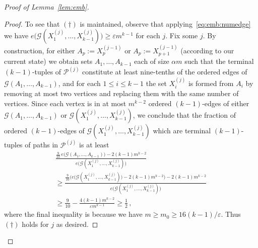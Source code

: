 \documentclass[12pt,a4paper]{amsart}
\let\eps\varepsilon
\newcommand{\oldqed}{}
\def\endofClaim{\hfill\scalebox{.6}{$\Box$}}
\newenvironment{claimproof}[1][Proof]{
  \renewcommand{\oldqed}{\qedsymbol}
  \renewcommand{\qedsymbol}{\endofClaim}
  \begin{proof}[#1]
}{
  \end{proof}
  \renewcommand{\qedsymbol}{\oldqed}
}
\newcommand{\cG}{\mathcal{G}}
\newcommand{\paths}{\mathscr{P}}
\begin{document}
\begin{proof}[Proof of Lemma~\ref{lem:emb}]
\begin{claimproof}
 To see that $(\dagger)$ is maintained, observe that applying~\eqref{eq:emb:numedge} we have $e\big(\cG(X_1^{(j)},\ldots,X_{k-1}^{(j)})\big)\ge\eps m^{k-1}$ for each $j$. Fix some $j$. By construction, for either $A_p := X^{(j-1)}_p$ or $A_p := X^{(j-1)}_{p+1}$ (according to our current state) we obtain sets $A_1,\ldots,A_{k-1}$ each of size $\alpha m$ such that the terminal $(k-1)$-tuples of $\paths^{(j)}$ constitute at least nine-tenths of the ordered edges of $\cG(A_1,\ldots,A_{k-1})$, and for each $1\le i\le k-1$ the set $X_i^{(j)}$ is formed from $A_i$ by removing at most two vertices and replacing them with the same number of vertices. Since each vertex is in at most $m^{k-2}$ ordered $(k-1)$-edges of either $\cG(A_1,\ldots,A_{k-1})$ or $\cG(X_1^{(j)},\ldots,X_{k-1}^{(j)})$, we conclude that the fraction of ordered $(k-1)$-edges of $\cG(X_1^{(j)},\ldots,X_{k-1}^{(j)})$ which are terminal $(k-1)$-tuples of paths in $\paths^{(j)}$ is at least
 \begin{multline*}
  \frac{\frac{9}{10}\,e\big(\cG(A_1,\ldots,A_{k-1})\big)-2(k-1) m^{k-2}}{e\big(\cG(X_1^{(j)},\ldots,X_{k-1}^{(j)})\big)}\\
  \ge \frac{\frac{9}{10}\big(e\big(\cG(X_1^{(j)},\ldots,X_{k-1}^{(j)})\big)-2(k-1) m^{k-2}\big)-2(k-1) m^{k-2}}{e\big(\cG(X_1^{(j)},\ldots,X_{k-1}^{(j)})\big)}\\
  \ge \frac{9}{10}-\frac{4(k-1) m^{k-2}}{\eps m^{k-1}}\ge \frac12\,,
 \end{multline*}
 where the final inequality is because we have $m\ge m_0\ge 16(k-1)/\eps$. Thus $(\dagger)$ holds for $j$ as desired.


\end{claimproof}
\end{proof}
\end{document}
